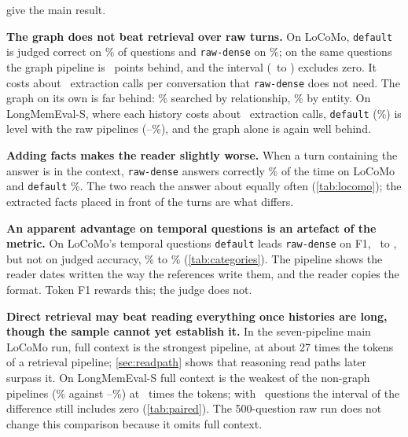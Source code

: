 \documentclass[11pt,letterpaper]{article}
\newcommand{\pipe}[1]{\texttt{#1}}
\begin{document}
\begin{table}[ht]
\centering
\caption{Difference from \pipe{raw-dense} on the same questions, in points, with 95\% intervals. Bold marks intervals that exclude zero.}
\label{tab:paired}
\small

\end{table}

 give the main result.

\textbf{The graph does not beat retrieval over raw turns.} On LoCoMo, \pipe{default} is judged correct on \numLocomoDefaultJudged\% of questions and \pipe{raw-dense} on \numLocomoRawDenseJudged\%; on the same questions the graph pipeline is \numLocomoDefaultVsDense\ points behind, and the interval (\numLocomoDefaultVsDenseLow\ to \numLocomoDefaultVsDenseHigh) excludes zero. It costs about \numLocomoGraphCalls\ extraction calls per conversation that \pipe{raw-dense} does not need. The graph on its own is far behind: \numLocomoGraphFactsJudged\% searched by relationship, \numLocomoGraphEntitiesJudged\% by entity. On LongMemEval-S, where each history costs about \numLmeGraphCalls\ extraction calls, \pipe{default} (\numLmeDefaultJudged\%) is level with the raw pipelines (\numLmeRawDenseJudged--\numLmeRawHybridJudged\%), and the graph alone is again well behind.

\textbf{Adding facts makes the reader slightly worse.} When a turn containing the answer is in the context, \pipe{raw-dense} answers correctly \numLocomoWithEvidenceDense\% of the time on LoCoMo and \pipe{default} \numLocomoWithEvidenceDefault\%. The two reach the answer about equally often (\cref{tab:locomo}); the extracted facts placed in front of the turns are what differs.

\textbf{An apparent advantage on temporal questions is an artefact of the metric.} On LoCoMo's temporal questions \pipe{default} leads \pipe{raw-dense} on F1, \numLocomoTemporalDefaultFone\ to \numLocomoTemporalDenseFone, but not on judged accuracy, \numLocomoTemporalDefaultJudged\% to \numLocomoTemporalDenseJudged\% (\cref{tab:categories}). The pipeline shows the reader dates written the way the references write them, and the reader copies the format. Token F1 rewards this; the judge does not.

\textbf{Direct retrieval may beat reading everything once histories are long, though the sample cannot yet establish it.} In the seven-pipeline main LoCoMo run, full context is the strongest pipeline, at about 27 times the tokens of a retrieval pipeline; \cref{sec:readpath} shows that reasoning read paths later surpass it. On LongMemEval-S full context is the weakest of the non-graph pipelines (\numLmeFullContextJudged\% against \numLmeRawDenseJudged--\numLmeRawHybridJudged\%) at \numLmeTokenRatio\ times the tokens; with \numLmeQuestions\ questions the interval of the difference still includes zero (\cref{tab:paired}). The 500-question raw run does not change this comparison because it omits full context.
\end{document}
